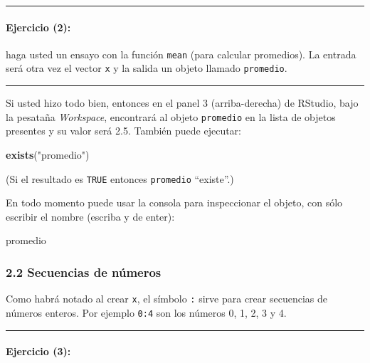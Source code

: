 \documentclass[]{article}
\newenvironment{Shaded}{}{}
\newcommand{\KeywordTok}[1]{\textcolor[rgb]{0.00,0.44,0.13}{\textbf{{#1}}}}
\newcommand{\StringTok}[1]{\textcolor[rgb]{0.25,0.44,0.63}{{#1}}}
\newcommand{\NormalTok}[1]{{#1}}
\begin{document}
\begin{center}\rule{3in}{0.4pt}\end{center}

\paragraph{Ejercicio (2):}

haga usted un ensayo con la función \texttt{mean} (para calcular
promedios). La entrada será otra vez el vector \texttt{x} y la salida un
objeto llamado \texttt{promedio}.

\begin{center}\rule{3in}{0.4pt}\end{center}

Si usted hizo todo bien, entonces en el panel 3 (arriba-derecha) de
RStudio, bajo la pesataña \emph{Workspace}, encontrará al objeto
\texttt{promedio} en la lista de objetos presentes y su valor será 2.5.
También puede ejecutar:

\begin{Shaded}
\begin{Highlighting}[]
\KeywordTok{exists}\NormalTok{(}\StringTok{"promedio"}\NormalTok{)}
\end{Highlighting}
\end{Shaded}
(Si el resultado es \texttt{TRUE} entonces \texttt{promedio}
``existe''.)

En todo momento puede usar la consola para inspeccionar el objeto, con
sólo escribir el nombre (escriba y de enter):

\begin{Shaded}
\begin{Highlighting}[]
\NormalTok{promedio}
\end{Highlighting}
\end{Shaded}
\subsubsection{2.2 Secuencias de números}

Como habrá notado al crear \texttt{x}, el símbolo \texttt{:} sirve para
crear secuencias de números enteros. Por ejemplo \texttt{0:4} son los
números 0, 1, 2, 3 y 4.

\begin{center}\rule{3in}{0.4pt}\end{center}

\paragraph{Ejercicio (3):}
\end{document}
